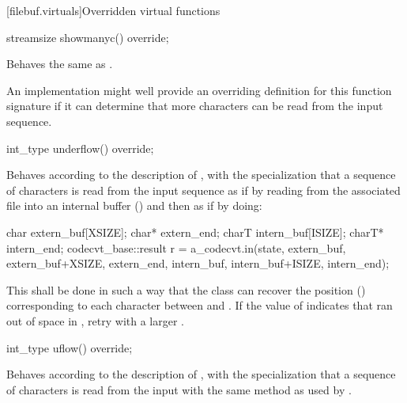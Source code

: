 [filebuf.virtuals]{Overridden virtual functions}

%
\begin{itemdecl}
streamsize showmanyc() override;
\end{itemdecl}

\begin{itemdescr}
\pnum
\effects
Behaves the same as
.
%

\pnum
\remarks
An
implementation might well provide an overriding definition for this function
signature if it can determine that more characters can be read from the input
sequence.
\end{itemdescr}

%
\begin{itemdecl}
int_type underflow() override;
\end{itemdecl}

\begin{itemdescr}
\pnum
\effects
Behaves according to the description of
,
with the specialization that a sequence of characters is read from the input
sequence as if by reading from the associated file
into an internal buffer ()
and then as if by doing:

\begin{codeblock}
char   extern_buf[XSIZE];
char*  extern_end;
charT  intern_buf[ISIZE];
charT* intern_end;
codecvt_base::result r =
  a_codecvt.in(state, extern_buf, extern_buf+XSIZE, extern_end,
               intern_buf, intern_buf+ISIZE, intern_end);
\end{codeblock}

This shall be done in such a way that the class can recover the
position
()
corresponding to each character between
and
.
If the value of
indicates that
ran out of space in
,
retry with a larger
.
\end{itemdescr}

%
\begin{itemdecl}
int_type uflow() override;
\end{itemdecl}

\begin{itemdescr}
\pnum
\effects
Behaves according to the description of
,
with the specialization that a sequence of characters is read from the input
with the same method as used by
.
\end{itemdescr}

